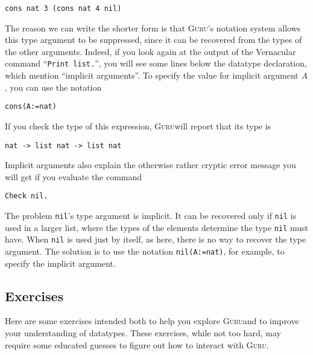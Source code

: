 \documentclass{book}[12pt]
\newcommand{\guru}[0]{\textsc{Guru}}
\begin{document}
\begin{verbatim}
cons nat 3 (cons nat 4 nil)
\end{verbatim}

\noindent The reason we can write the shorter form is that \guru's
notation system allows this type argument to be suppressed, since it
can be recovered from the types of the other arguments.  Indeed, if
you look again at the output of the Vernacular command ``\texttt{Print
list.}'', you will see some lines below the datatype declaration,
which mention ``implicit arguments''.  To specify the value for
implicit argument $A$, you can use the notation

\begin{verbatim}
cons(A:=nat)
\end{verbatim}

\noindent If you check the type of this expression, \guru will report
that its type is 

\begin{verbatim}
nat -> list nat -> list nat
\end{verbatim}

Implicit arguments also explain the otherwise rather cryptic error
message you will get if you evaluate the command

\begin{verbatim}
Check nil.
\end{verbatim}

\noindent The problem \texttt{nil}'s type argument is implicit. It can
be recovered only if \texttt{nil} is used in a larger list, where the
types of the elements determine the type \texttt{nil} must have.  When
\texttt{nil} is used just by itself, as here, there is no way to
recover the type argument.  The solution is to use the notation
\texttt{nil(A:=nat)}, for example, to specify the implicit argument.

\subsection{Exercises}

Here are some exercises intended both to help you explore \guru and to
improve your understanding of datatypes.  These exercises, while not
too hard, may require some educated guesses to figure out how to
interact with \guru.
\end{document}

